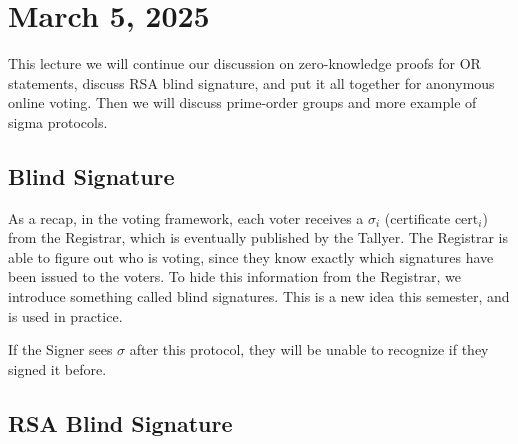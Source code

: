 \section{March 5, 2025}
\label{20250305}

This lecture we will continue our discussion on zero-knowledge proofs for OR statements, discuss RSA blind signature, and put it all together for anonymous online voting. Then we will discuss prime-order groups and more example of sigma protocols.

\subsection{Blind Signature}

As a recap, in the voting framework, each voter receives a $\sigma_i$ (certificate $\text{cert}_i$) from the Registrar, which is eventually published by the Tallyer. The Registrar is able to figure out who is voting, since they know exactly which signatures have been issued to the voters. To hide this information from the Registrar, we introduce something called blind signatures. This is a new idea this semester, and is used in practice.


If the Signer sees $\sigma$ after this protocol, they will be unable to recognize if they signed it before.

\subsection{RSA Blind Signature}


